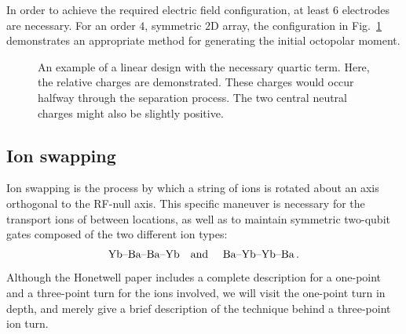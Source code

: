 \documentclass[12pt,a4paper]{amsart}
\numberwithin{equation}{section}
\theoremstyle{plain}
\theoremstyle{definition}
\begin{document}
In order to achieve the required electric field configuration, at least $6$ electrodes are necessary. For an order $4$, symmetric $2$D array, the configuration in Fig.~\ref{fig:ioniTraSepa3} demonstrates an appropriate method for generating the initial octopolar moment.



\begin{figure}
\centering
{}
    \caption{An example of a linear design with the necessary quartic term. Here, the relative charges are demonstrated. These charges would occur halfway through the separation process. The two central neutral charges might also be slightly positive.}
    \label{fig:ioniTraSepa3}
\end{figure}

\subsection{Ion swapping}

Ion swapping is the process by which a string of ions is rotated about an axis orthogonal to the RF-null axis. This specific maneuver is necessary for the transport ions of between locations, as well as to maintain symmetric two-qubit gates composed of the two different ion types:
$$
\mbox{Yb--Ba--Ba--Yb\quad  and \quad Ba--Yb--Yb--Ba}\, .
$$
Although the Honetwell paper includes a complete description for a one-point and a three-point turn for the ions involved, we will visit the one-point turn in depth, and merely give a brief description of the technique behind a three-point ion turn.\cite{ioniTranSwap}
\end{document}
